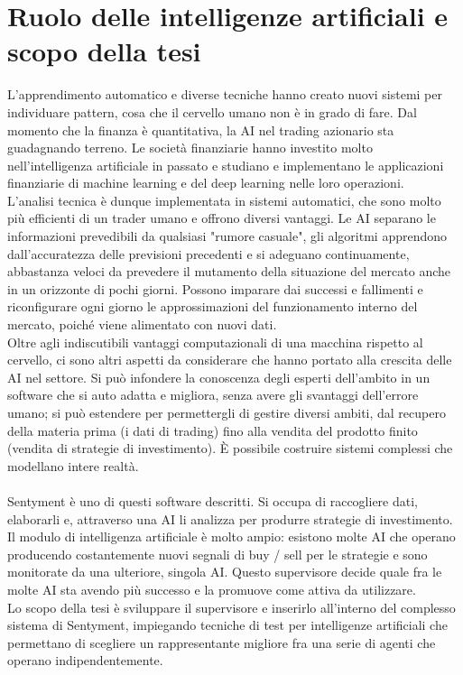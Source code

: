 \documentclass[a4paper,12pt]{report}
\begin{document}
\section{Ruolo delle intelligenze artificiali e scopo della tesi}		
L'apprendimento automatico e diverse tecniche hanno creato nuovi sistemi per individuare pattern, cosa che il cervello umano non è in grado di fare. Dal momento che la finanza è quantitativa, la AI nel trading azionario sta guadagnando terreno. Le società finanziarie hanno investito molto nell'intelligenza artificiale in passato e studiano e implementano le applicazioni finanziarie di machine learning e del deep learning nelle loro operazioni.\\
L'analisi tecnica è dunque implementata in sistemi automatici, che sono molto più efficienti di un trader umano e offrono diversi vantaggi. Le AI separano le informazioni prevedibili da qualsiasi "rumore casuale", gli algoritmi apprendono dall'accuratezza delle previsioni precedenti e si adeguano continuamente, abbastanza veloci da prevedere il mutamento della situazione del mercato anche in un orizzonte di pochi giorni. Possono imparare dai successi e fallimenti e riconfigurare ogni giorno le approssimazioni del funzionamento interno del mercato, poiché viene alimentato con nuovi dati.\\
Oltre agli indiscutibili vantaggi computazionali di una macchina rispetto al cervello, ci sono altri aspetti da considerare che hanno portato alla crescita delle AI nel settore. Si può infondere la conoscenza degli esperti dell'ambito in un software che si auto adatta e migliora, senza avere gli svantaggi dell'errore umano; si può estendere per permettergli di gestire diversi ambiti, dal recupero della materia prima (i dati di trading) fino alla vendita del prodotto finito (vendita di strategie di investimento). È possibile costruire sistemi complessi che modellano intere realtà.\\~\\
Sentyment è uno di questi software descritti. Si occupa di raccogliere dati, elaborarli e, attraverso una AI li analizza per produrre strategie di investimento. Il modulo di intelligenza artificiale è molto ampio: esistono molte AI che operano producendo costantemente nuovi segnali di buy / sell per le strategie e sono monitorate da una ulteriore, singola AI. Questo supervisore decide quale fra le molte AI sta avendo più successo e la promuove come attiva da utilizzare.\\
Lo scopo della tesi è sviluppare il supervisore e inserirlo all'interno del complesso sistema di Sentyment, impiegando tecniche di test per intelligenze artificiali che permettano di scegliere un rappresentante migliore fra una serie di agenti che operano indipendentemente.
\end{document}
